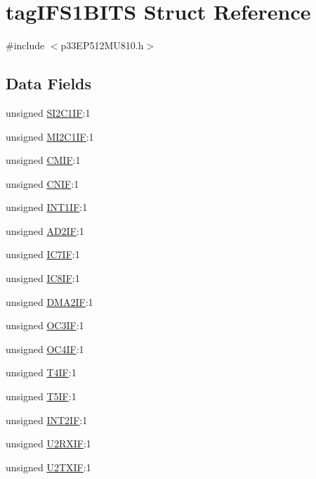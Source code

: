 \hypertarget{structtag_i_f_s1_b_i_t_s}{}\section{tag\+I\+F\+S1\+B\+I\+TS Struct Reference}
\label{structtag_i_f_s1_b_i_t_s}


{\ttfamily \#include $<$p33\+E\+P512\+M\+U810.\+h$>$}

\subsection*{Data Fields}
\begin{DoxyCompactItemize}
\item 
unsigned \hyperlink{structtag_i_f_s1_b_i_t_s_aadf6bf0f33d5dd246a93dae6f85e501b}{S\+I2\+C1\+IF}\+:1
\item 
unsigned \hyperlink{structtag_i_f_s1_b_i_t_s_a1678a4aa50032c05c0db7b66e7b10229}{M\+I2\+C1\+IF}\+:1
\item 
unsigned \hyperlink{structtag_i_f_s1_b_i_t_s_a36bdd9fcc72215b60877d39e7559d891}{C\+M\+IF}\+:1
\item 
unsigned \hyperlink{structtag_i_f_s1_b_i_t_s_a77e514578c157106fc3adb9252478a7a}{C\+N\+IF}\+:1
\item 
unsigned \hyperlink{structtag_i_f_s1_b_i_t_s_a4e56150cdbcf8dcb0ba5b66a194e49cc}{I\+N\+T1\+IF}\+:1
\item 
unsigned \hyperlink{structtag_i_f_s1_b_i_t_s_af4653f8eff94ea3c64e079756946bf22}{A\+D2\+IF}\+:1
\item 
unsigned \hyperlink{structtag_i_f_s1_b_i_t_s_a7a70915406d737fafd34b66995d81b2b}{I\+C7\+IF}\+:1
\item 
unsigned \hyperlink{structtag_i_f_s1_b_i_t_s_a2bb1f4cf9b80b8de544c5cd0d1e4464e}{I\+C8\+IF}\+:1
\item 
unsigned \hyperlink{structtag_i_f_s1_b_i_t_s_a00116bb8d4ad44114643e506f6412d14}{D\+M\+A2\+IF}\+:1
\item 
unsigned \hyperlink{structtag_i_f_s1_b_i_t_s_ac7f95026dc4200cf5a7e2044ef8a7db4}{O\+C3\+IF}\+:1
\item 
unsigned \hyperlink{structtag_i_f_s1_b_i_t_s_a2cf528b27f00170b2feea23dd3e348bf}{O\+C4\+IF}\+:1
\item 
unsigned \hyperlink{structtag_i_f_s1_b_i_t_s_a02447fcb96d42e2ce024570db5daf01a}{T4\+IF}\+:1
\item 
unsigned \hyperlink{structtag_i_f_s1_b_i_t_s_ad0cc53637453b3868c315b6aee635c49}{T5\+IF}\+:1
\item 
unsigned \hyperlink{structtag_i_f_s1_b_i_t_s_a61bc052ba769d17e910f929ea5c9896b}{I\+N\+T2\+IF}\+:1
\item 
unsigned \hyperlink{structtag_i_f_s1_b_i_t_s_a3e744396e98fbf0f846f49c7aad17fd6}{U2\+R\+X\+IF}\+:1
\item 
unsigned \hyperlink{structtag_i_f_s1_b_i_t_s_a66d2dadb9cc3580e0b4f16019147ff88}{U2\+T\+X\+IF}\+:1
\end{DoxyCompactItemize}


